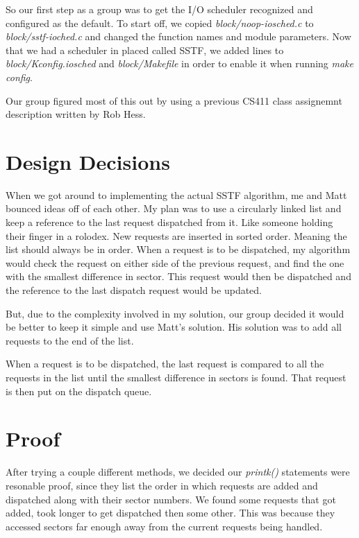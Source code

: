 \documentclass[letterpaper,10pt,titlepage]{article}
\begin{document}
So our first step as a group was to get the I/O scheduler recognized and
configured as the default. To start off, we copied
\emph{block/noop-iosched.c} to \emph{block/sstf-ioched.c} and changed
the function names and module parameters. Now that we had a scheduler in
placed called SSTF, we added lines to \emph{block/Kconfig.iosched} and
\emph{block/Makefile} in order to enable it when running \emph{make
config}.

Our group figured most of this out by using a previous CS411 class
assignemnt description written by Rob Hess.

\section*{Design Decisions}

When we got around to implementing the actual SSTF algorithm, me and
Matt bounced ideas off of each other. My plan was to use a circularly
linked list and keep a reference to the last request dispatched from it.
Like someone holding their finger in a rolodex. New requests are
inserted in sorted order. Meaning the list should always be in order.
When a request is to be dispatched, my algorithm would check the
request on either side of the previous request, and find the one with the
smallest difference in sector. This request would then be dispatched and
the reference to the last dispatch request would be updated.

But, due to the complexity involved in my solution, our group decided it
would be better to keep it simple and use Matt's solution. His solution
was to add all requests to the end of the list. 



When a request is to be
dispatched, the last request is compared to all the requests in the list
until the smallest difference in sectors is found. That request is then
put on the dispatch queue.



\section*{Proof}

After trying a couple different methods, we decided our \emph{printk()}
statements were resonable proof, since they list the order in which
requests are added and dispatched along with their sector numbers. We
found some requests that got added, took longer to get dispatched then
some other. This was because they accessed sectors far enough away from
the current requests being handled.
\end{document}
